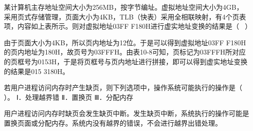 某计算机主存地址空间大小为256MB，按字节编址。虚拟地址空间大小为4GB，采用页式存储管理，页面大小为4KB，TLB（快表）采用全相联映射，有4个页表项，内容如上表所示。则对虚拟地址03FF
F180H进行虚实地址变换的结果是（ ~）
\par{}
\begin{solution}由于页面大小为4KB，所以页内地址为12位。于是可以得到虚拟地址03FF
F180H的页内地址为180H，故页号为03FFFH。由表10-8可知，页标记为03FFFH所对应的页框号为0153H，于是将页框号与页内地址进行拼接，即可以得到虚实地址变换的结果是015
3180H。
\end{solution}
\question 若用户进程访问内存时产生缺页，则下列选项中，操作系统可能执行的操作是（
）。 Ⅰ．处理越界错 Ⅱ．置换页 Ⅲ．分配内存
\par{}
\begin{solution}用户进程访问内存时缺页会发生缺页中断。发生缺页中断，系统执行的操作可能是置换页面或分配内存。系统内没有越界的错误，不会进行越界出错处理。
\end{solution}
